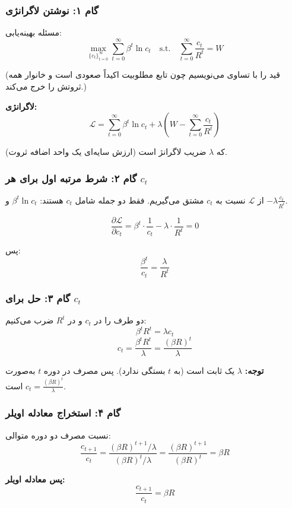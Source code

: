\documentclass[12pt,a4paper]{article}
\begin{document}
\subsubsection{گام ۱: نوشتن لاگرانژی}

مسئله بهینه‌یابی:
\[
	\max_{\{c_t\}_{t=0}^{\infty}} \sum_{t=0}^{\infty} \beta^t \ln c_t
	\quad \text{s.t.} \quad
	\sum_{t=0}^{\infty} \frac{c_t}{R^t} = W
\]

(قید را با تساوی می‌نویسیم چون تابع مطلوبیت اکیداً صعودی است و خانوار همه ثروتش را خرج می‌کند.)

\textbf{لاگرانژی:}
\[
	\mathcal{L} = \sum_{t=0}^{\infty} \beta^t \ln c_t + \lambda \left( W - \sum_{t=0}^{\infty} \frac{c_t}{R^t} \right)
\]

که $\lambda$ ضریب لاگرانژ است (ارزش سایه‌ای یک واحد اضافه ثروت).

\subsubsection{گام ۲: شرط مرتبه اول برای هر $c_t$}

از $\mathcal{L}$ نسبت به $c_t$ مشتق می‌گیریم. فقط دو جمله شامل $c_t$ هستند: $\beta^t \ln c_t$ و $-\lambda \frac{c_t}{R^t}$.

\[
	\frac{\partial \mathcal{L}}{\partial c_t} = \beta^t \cdot \frac{1}{c_t} - \lambda \cdot \frac{1}{R^t} = 0
\]

پس:
\[
	\frac{\beta^t}{c_t} = \frac{\lambda}{R^t}
\]

\subsubsection{گام ۳: حل برای $c_t$}

دو طرف را در $c_t$ و در $R^t$ ضرب می‌کنیم:
\[
	\beta^t R^t = \lambda c_t
\]
\[
	c_t = \frac{\beta^t R^t}{\lambda} = \frac{(\beta R)^t}{\lambda}
\]

\textbf{توجه:} $\lambda$ یک ثابت است (به $t$ بستگی ندارد). پس مصرف در دوره $t$ به‌صورت $c_t = \frac{(\beta R)^t}{\lambda}$ است.

\subsubsection{گام ۴: استخراج معادله اویلر}

نسبت مصرف دو دوره متوالی:
\[
	\frac{c_{t+1}}{c_t} = \frac{(\beta R)^{t+1}/\lambda}{(\beta R)^t/\lambda} = \frac{(\beta R)^{t+1}}{(\beta R)^t} = \beta R
\]

\textbf{پس معادله اویلر:}
\[
	\boxed{\frac{c_{t+1}}{c_t} = \beta R}
\]
\end{document}
